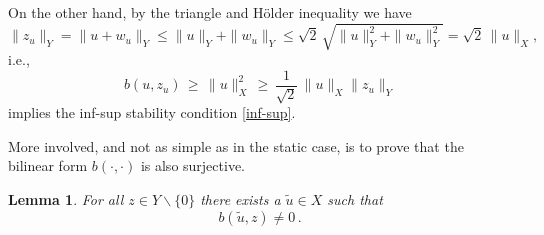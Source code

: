 \documentclass[12pt]{article}
\newtheorem{lemma}[theorem]{Lemma}
\numberwithin{equation}{section}
\begin{document}
On the other hand, by the triangle and H\"older inequality we have
\[
  \| z_u \|_Y = \| u + w_u \|_Y \leq \| u \|_Y + \| w_u \|_Y
  \leq \sqrt{2} \, \sqrt{\| u \|_Y^2 + \| w_u \|_Y^2} =
  \sqrt{2} \, \| u \|_X ,
\]
i.e.,
\[
  b(u,z_u) \, \geq \, \| u \|_X^2 \, \geq \,
  \frac{1}{\sqrt{2}} \, \| u \|_X \| z_u \|_Y
\]
implies the inf-sup stability condition \eqref{inf-sup}.

More involved, and not as simple as in the static case, is to prove that the
bilinear form $b(\cdot,\cdot)$ is also surjective.

\begin{lemma}\label{Lemma surjective}
  For all $ z \in Y \backslash \{ 0 \}$ there exists a
  $\widetilde{u} \in X$ such that
  \[
    b(\widetilde{u},z) \neq 0 \, .
  \]
\end{lemma}
\end{document}
